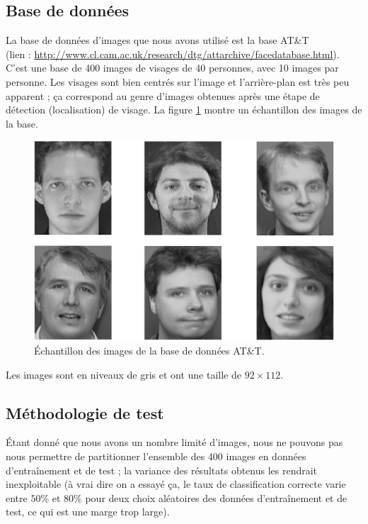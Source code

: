 \subsection{Base de données}
La base de données d'images que nous avons utilisé est la base AT\&T\\
(lien : \url{http://www.cl.cam.ac.uk/research/dtg/attarchive/facedatabase.html}).
C'est une base de 400 images de visages de 40 personnes, avec 10 images 
par personne. Les visages sont bien centrés sur l'image et l'arrière-plan
est très peu apparent ; ça correspond au genre d'images obtenues après une étape de 
détection (localisation) de visage. La figure \ref{fig:implementation:bdd_exemple} montre
un échantillon des images de la base.
\begin{figure}[H]
    \centering
    \includegraphics[scale=0.4]{images/bdd_exemple}
    \caption{Échantillon des images de la base de données AT\&T.}
    \label{fig:implementation:bdd_exemple}
\end{figure}
Les images sont en niveaux de gris et ont une taille de $92 \times 112$.


\subsection{Méthodologie de test}
Étant donné que nous avons un nombre limité d'images, nous ne pouvons pas
nous permettre de partitionner l'ensemble des 400 images en données 
d’entraînement et de test ; la variance des résultats obtenus les rendrait
inexploitable (à vrai dire on a essayé ça, le taux de classification correcte
varie entre $50\%$ et $80\%$ pour deux choix aléatoires des données d'entraînement
et de test, ce qui est une marge trop large).

